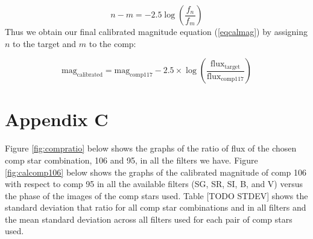 \documentclass[linenumbers]{aastex631}
\begin{document}
\begin{equation}
    n-m = -2.5 \log (\frac {f_n} {f_m})
\end{equation}
Thus we obtain our final calibrated magnitude equation (\ref{eqcalmag}) by assigning $n$ to the target and $m$ to the comp: 

\begin{equation}
    \text {mag} _ {\text {calibrated}} = \text {mag} _ {\text {comp117}} - 2.5 \times \log \left( \frac {\text {flux} _ {\text {target}}} {\text {flux} _ {\text {comp117}}} \right) 
\end{equation}


\section{Appendix C} \label{appc}
Figure \ref{fig:compratio} below shows the graphs of the ratio of flux of the chosen comp star combination, 106 and 95, in all the filters we have. Figure \ref{fig:calcomp106} below shows the graphs of the calibrated magnitude of comp 106 with respect to comp 95 in all the available filters (SG, SR, SI, B, and V) versus the phase of the images of the comp stars used. Table [TODO STDEV] shows the standard deviation that ratio for all comp star combinations and in all filters and the mean standard deviation across all filters used for each pair of comp stars used.
\end{document}
